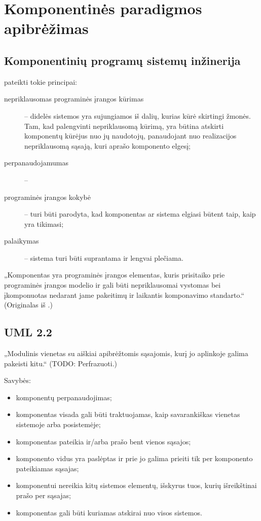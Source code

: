 \chapter{Komponentinės paradigmos apibrėžimas}

\section{Komponentinių programų sistemų inžinerija}

\cite{analytical-study-cbse} pateikti tokie principai:
\begin{description}
  \item[nepriklausomas programinės įrangos kūrimas]  – didelės sistemos yra sujungiamos iš dalių,
    kurias kūrė skirtingi žmonės. Tam, kad palengvinti nepriklausomą
    kūrimą, yra būtina atskirti komponentų kūrėjus nuo jų naudotojų,
    panaudojant nuo realizacijos nepriklausomą sąsają, kuri aprašo
    komponento elgesį;
  \item[perpanaudojamumas]  – 
  \item[programinės įrangos kokybė]  – turi
    būti parodyta, kad komponentas ar sistema elgiasi būtent taip, kaip
    yra tikimasi;
  \item[palaikymas]  – sistema turi būti suprantama
    ir lengvai plečiama.
\end{description}

„Komponentas yra programinės įrangos elementas, kuris prisitaiko prie
programinės įrangos modelio ir gali būti nepriklausomai vystomas
bei įkomponuotas nedarant jame pakeitimų ir laikantis komponavimo
standarto.“\cite[438]{analytical-study-cbse} (Originalas iš
\cite{heineman2001component}.)

\section{UML 2.2}

„Modulinis vienetas su aiškiai apibrėžtomis sąsajomis, kurį jo
aplinkoje galima pakeisti kitu.“\cite[143]{UML-superstructure}
(TODO: Perfrazuoti.)

Savybės:
\begin{itemize}
  \item komponentų perpanaudojimas;
  \item komponentas visada gali būti traktuojamas, kaip savarankiškas
    vienetas sistemoje arba posistemėje;
  \item komponentas pateikia ir/arba prašo bent vienos sąsajos;
  \item komponento vidus yra paslėptas ir prie jo galima prieiti tik
    per komponento pateikiamas sąsajas;
  \item komponentui nereikia kitų sistemos elementų, išskyrus tuos, kurių
    išreikštinai prašo per sąsajas;
  \item komponentas gali būti kuriamas atskirai nuo visos sistemos.
\end{itemize}

